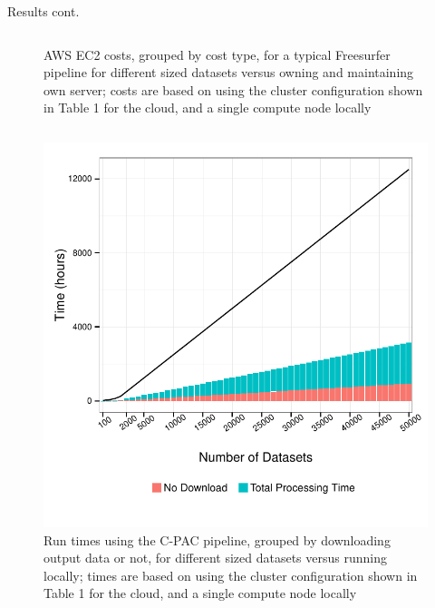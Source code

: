 \documentclass[final,hyperref={pdfpagelabels=false}]{beamer}
\begin{document}
\begin{frame}
\begin{columns}
\begin{column}{.5\textwidth}
{\begin{block}{Results cont.}
\begin{column}{.47\textwidth}
\begin{figure}
                    \caption{\label{fig:fs-costs}AWS EC2 costs, grouped by cost type, for a typical Freesurfer pipeline for different sized datasets versus owning and maintaining own server; costs are based on using the cluster configuration shown in Table 1 for the cloud, and a single compute node locally}
                \end{figure}
            \end{column}
            \begin{column}{.47\textwidth}
                \begin{figure}
                    \includegraphics[width=.99\textwidth]{cpac-times.pdf}
                    \caption{\label{fig:cpac-times}Run times using the C-PAC pipeline, grouped by downloading output data or not, for different sized datasets versus running locally; times are based on using the cluster configuration shown in Table 1 for the cloud, and a single compute node locally}
                \end{figure}
                \begin{figure}

\end{figure}
\end{column}
\end{block}}
\end{column}
\end{columns}
\end{frame}
\end{document}
